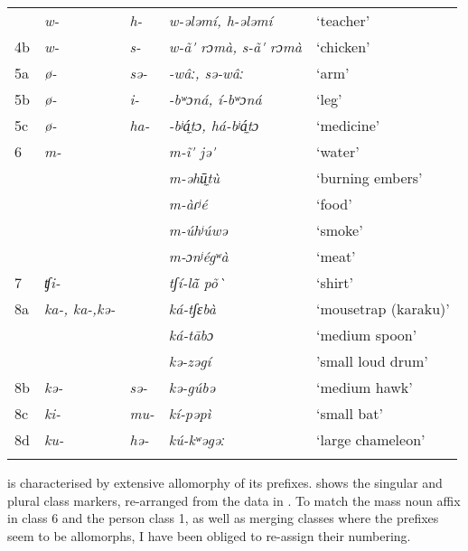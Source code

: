 \documentclass[output=paper]{langsci/langscibook}
\begin{document}
\begin{table}[p]
\begin{tabularx}{\textwidth}{lllll}
        &  \textit{w-}               	&   \textit{h-}     & \textit{w-ələmí, h-ələmí}	& `teacher' \\
4b	& \textit{w-}	& \textit{s-}	& \textit{w-ã\'{} rɔmà, s-ã\'{} rɔmà}	& `chicken'\\
5a	& \textit{ø-}	& \textit{sə-}	& \textit{-wâː, sə-wâː}	& `arm'\\
5b	& \textit{ø-}	& \textit{i-}	& \textit{-bʷɔná, í-bʷɔná}	& `leg'\\
5c	& \textit{ø-}	& \textit{ha-}	& \textit{-bʲá{̼t}ɔ, há-bʲá{̼t}ɔ}	& `medicine'\\
% 
% 
% 
6	& \textit{m-}	& 	& \textit{m-ĩ\'{} jə\'{}} & `water'  \\
	&  	& 	&  \textit{m-əhū{̼t}ù} & `burning embers'   \\
	&  	& 	& \textit{m-àɾʲé}& `food'  \\
	&  	& 	& \textit{m-úhʲúwə} & `smoke'  \\
	&  	& 	& \textit{m-ɔnʲégʷà}	& `meat'\\
7	& \textit{ʧi-}	& 	& \textit{tʃí-lã\={} põ\`{} }	& `shirt'\\
8a	& \textit{ka-, ka-,kə-}	& 	& \textit{ká-tʃɛbà} & `mousetrap (karaku)'  \\
	&  	& 	& \textit{ká-tābɔ} & `medium spoon'\\
	&  	& 	& \textit{kə-zəgí} &	'small loud drum'\\
8b	& \textit{kə-}	& \textit{{sə-}}	& \textit{kə-gúbə}	& `medium hawk'\\
8c	& \textit{ki-}	& \textit{mu-}	& \textit{kí-pəpì}	& `small bat'\\
8d	& \textit{ku-}	& \textit{{hə-}}	& \textit{kú-kʷəgəː}	& `large chameleon'\\
\lspbottomrule
\end{tabularx}
\end{table}

 is characterised by extensive allomorphy of its prefixes.  shows the singular and plural class markers, re-arranged from the data in    \citet{HackettDavey2009}. To match the mass noun affix in class 6 and the person class 1, as well as merging classes where the prefixes seem to be allomorphs, I have been obliged to re-assign their numbering. 
  
\end{document}
